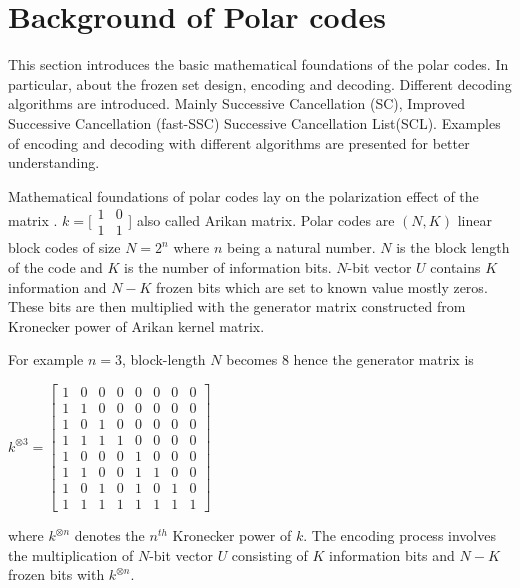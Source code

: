\section{Background of Polar codes} 
This section introduces the basic mathematical foundations of the polar codes. In particular, about the frozen set design, encoding and decoding. Different decoding algorithms are introduced. Mainly Successive Cancellation (SC), Improved Successive Cancellation (fast-SSC) Successive Cancellation List(SCL). Examples of encoding and decoding with different algorithms are presented for better understanding.


Mathematical foundations of polar codes lay on the polarization effect of the matrix \cite{Arikan}. $ k = \big[\begin{smallmatrix} 1 & 0 \\ 1 & 1 \end{smallmatrix}$\big] also called Arikan matrix. Polar codes are $(N,K)$ linear block codes of size $N = 2^{n}$ where $n$ being a natural number. $N$ is the block length of the code and $K$ is the number of information bits.  $N$-bit vector $U$ contains $K$ information and $N-K$ frozen bits which are set to known value mostly zeros. These bits are then multiplied with the generator matrix constructed from Kronecker power of Arikan kernel matrix.

For example $n=3$, block-length $N$ becomes $8$ hence the generator matrix is \newline

$ k^{\otimes 3} = \begin{bmatrix}
1 & 0 & 0 & 0 & 0 & 0 & 0 & 0\\ 
1 & 1 & 0 & 0 & 0 & 0 & 0 & 0\\ 
1 & 0 & 1 & 0 & 0 & 0 & 0 & 0\\ 
1 & 1 & 1 & 1 & 0 & 0 & 0 & 0\\ 
1 & 0 & 0 & 0 & 1 & 0 & 0 & 0\\ 
1 & 1 & 0 & 0 & 1 & 1 & 0 & 0\\ 
1 & 0 & 1 & 0 & 1 & 0 & 1 & 0\\ 
1 & 1 & 1 & 1 & 1 & 1 & 1 & 1
\end{bmatrix}$ \newline

where $k^{\otimes n}$ denotes the $n^{th}$ Kronecker power of $k$. The encoding process involves the multiplication of $N$-bit vector $U$ consisting of $K$ information bits and $N-K$ frozen bits with $k^{\otimes n}$.

